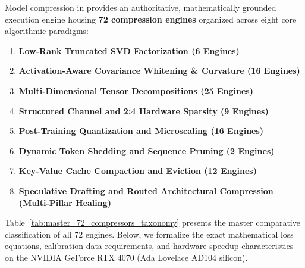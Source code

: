 Model compression in \neuralops{} provides an authoritative, mathematically grounded execution engine housing \textbf{72 compression engines} organized across eight core algorithmic paradigms:
\begin{enumerate}
\item \textbf{Low-Rank Truncated SVD Factorization (6 Engines)}
\item \textbf{Activation-Aware Covariance Whitening \& Curvature (16 Engines)}
\item \textbf{Multi-Dimensional Tensor Decompositions (25 Engines)}
\item \textbf{Structured Channel and 2:4 Hardware Sparsity (9 Engines)}
\item \textbf{Post-Training Quantization and Microscaling (16 Engines)}
\item \textbf{Dynamic Token Shedding and Sequence Pruning (2 Engines)}
\item \textbf{Key-Value Cache Compaction and Eviction (12 Engines)}
\item \textbf{Speculative Drafting and Routed Architectural Compression (Multi-Pillar Healing)}
\end{enumerate}
Table~\ref{tab:master_72_compressors_taxonomy} presents the master comparative classification of all 72 engines. Below, we formalize the exact mathematical loss equations, calibration data requirements, and hardware speedup characteristics on the NVIDIA GeForce RTX 4070 (Ada Lovelace AD104 silicon).

